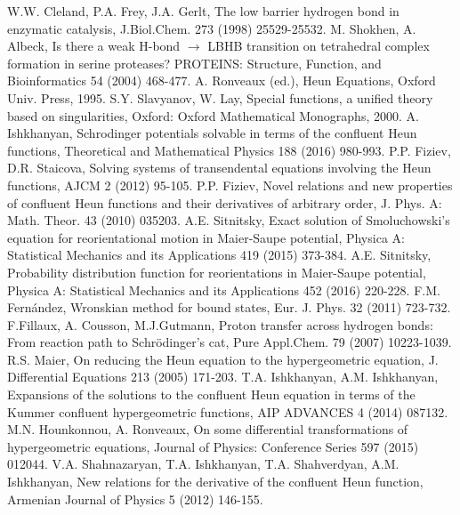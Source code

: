 \documentclass[singlespacing]{elsart}
\begin{document}
\begin{thebibliography}{00}
W.W. Cleland, P.A. Frey, J.A. Gerlt, The low barrier hydrogen bond in enzymatic catalysis, J.Biol.Chem.  273 (1998) 25529-25532.
M. Shokhen, A. Albeck, Is there a weak H-bond $\rightarrow$ LBHB transition on tetrahedral
complex formation in serine proteases? PROTEINS: Structure, Function, and Bioinformatics  54 (2004) 468-477.
A. Ronveaux (ed.), Heun Equations, Oxford Univ. Press, 1995.
S.Y. Slavyanov, W. Lay, Special functions, a unified theory based on singularities, Oxford: Oxford Mathematical Monographs, 2000.
A. Ishkhanyan, Schrodinger potentials solvable in terms of the confluent Heun functions, Theoretical and Mathematical Physics 188 (2016) 980-993.
P.P. Fiziev, D.R. Staicova, Solving systems of transendental equations involving the Heun functions,
AJCM 2 (2012) 95-105.
P.P. Fiziev, Novel relations and new properties of confluent Heun functions and
their derivatives of arbitrary order, J. Phys. A: Math. Theor. 43 (2010) 035203.
A.E. Sitnitsky, Exact solution of Smoluchowski's equation for reorientational motion in Maier-Saupe potential,
Physica A: Statistical Mechanics and its Applications 419 (2015) 373-384.
A.E. Sitnitsky, Probability distribution function for reorientations in Maier-Saupe potential,
Physica A: Statistical Mechanics and its Applications 452 (2016) 220-228.
F.M. Fern\'andez, Wronskian method for bound states, Eur. J. Phys. 32 (2011) 723-732.
F.Fillaux, A. Cousson, M.J.Gutmann, Proton transfer across hydrogen bonds: From reaction path to Schr\"odinger's cat, Pure Appl.Chem. 79 (2007) 10223-1039.
R.S. Maier, On reducing the Heun equation to the hypergeometric equation, J. Differential Equations 213 (2005) 171-203.
T.A. Ishkhanyan, A.M. Ishkhanyan, Expansions of the solutions to the confluent Heun equation
in terms of the Kummer confluent hypergeometric functions, AIP ADVANCES 4 (2014) 087132.
M.N. Hounkonnou, A. Ronveaux, On some differential transformations of hypergeometric equations, Journal of Physics: Conference Series 597 (2015) 012044.
V.A. Shahnazaryan, T.A. Ishkhanyan, T.A. Shahverdyan, A.M. Ishkhanyan, New relations for the derivative of the confluent Heun function, Armenian Journal of Physics 5 (2012) 146-155.
\end{thebibliography}
\end{document}
